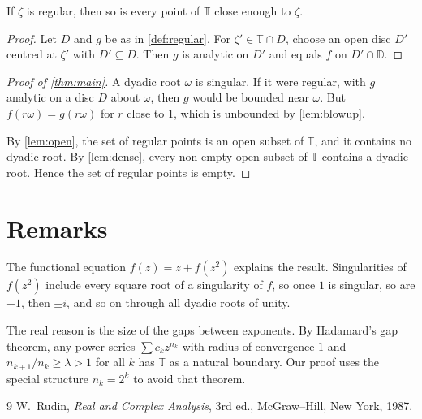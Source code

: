 \documentclass[11pt,a4paper]{article}
\begin{document}
\begin{lemma}\label{lem:open}
  If $\zeta$ is regular, then so is every point of $\mathbb{T}$ close enough to $\zeta$.
\end{lemma}

\begin{proof}
  Let $D$ and $g$ be as in \cref{def:regular}. For $\zeta' \in \mathbb{T} \cap D$,
  choose an open disc $D'$ centred at $\zeta'$ with $D' \subseteq D$. Then $g$ is
  analytic on $D'$ and equals $f$ on $D' \cap \mathbb{D}$.
\end{proof}

\begin{proof}[Proof of \cref{thm:main}]
  A dyadic root $\omega$ is singular. If it were regular, with $g$ analytic on a disc
  $D$ about $\omega$, then $g$ would be bounded near $\omega$. But
  $f(r\omega) = g(r\omega)$ for $r$ close to $1$, which is unbounded by
  \cref{lem:blowup}.

  By \cref{lem:open}, the set of regular points is an open subset of $\mathbb{T}$, and
  it contains no dyadic root. By \cref{lem:dense}, every non-empty open subset of
  $\mathbb{T}$ contains a dyadic root. Hence the set of regular points is empty.
\end{proof}

\section{Remarks}

\begin{remark}
  The functional equation $f(z) = z + f(z^2)$ explains the result. Singularities
  of $f(z^2)$ include every square root of a singularity of $f$, so once $1$ is
  singular, so are $-1$, then $\pm i$, and so on through all dyadic roots of unity.
\end{remark}

\begin{remark}
  The real reason is the size of the gaps between exponents. By Hadamard's gap
  theorem, any power series $\sum c_k z^{n_k}$ with radius of convergence $1$ and
  $n_{k+1} / n_k \geq \lambda > 1$ for all $k$ has $\mathbb{T}$ as a natural
  boundary. Our proof uses the special structure $n_k = 2^k$ to avoid that theorem.
\end{remark}

\begin{thebibliography}{9}
   W.~Rudin, \emph{Real and Complex Analysis}, 3rd ed.,
    McGraw--Hill, New York, 1987.
\end{thebibliography}
\end{document}
